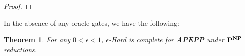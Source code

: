 \documentclass[11pt]{article}
\newtheorem{theorem}{Theorem}
\def\cl{\bf}
\begin{document}
\begin{proof}
\end{proof}

In the absence of any oracle gates, we have the following:
\begin{theorem}\label{thm:apepp-completeness}
For any $0 < \epsilon < 1$, {\sc $\epsilon$-Hard} is complete for {\cl APEPP} under ${\cl P}^{\cl NP}$ reductions.
\end{theorem}
\end{document}
